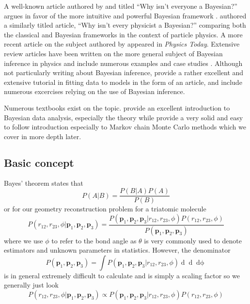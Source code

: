 A well-known article authored by \citet{Efron86} and titled ``Why isn't everyone a Bayesian?'' argues in favor of the more intuitive and powerful Bayesian framework . \citet{Cousins95} authored a similarly titled article, ``Why isn't every physicist a Bayesian?'' comparing both the classical and Bayesian frameworks in the context of particle physics. A more recent article on the subject authored by \citet{Lyons12} appeared in \emph{Physics Today}. Extensive review articles have been written on the more general subject of Bayesian inference in physics and include numerous examples and case studies \citet{vonToussaint11,Dose03,Dagostini03}. Although not particularly writing about Bayesian inference, \citet{Hogg10} provide a rather excellent and extensive tutorial in fitting data to models in the form of an article, and include numerous excercises relying on the use of Bayesian inference.

Numerous textbooks exist on the topic. \citet{Gelman14} provide an excellent introduction to Bayesian data analysis, especially the theory while \citet{Kruschke14} provide a very solid and easy to follow introduction especially to Markov chain Monte Carlo methods which we cover in more depth later.

\subsection{Basic concept}

Bayes' theorem states that
\begin{equation}
  P(A|B) = \frac{P(B|A) P(A)}{P(B)}
\end{equation}
or for our geometry reconstruction problem for a triatomic molecule
\begin{equation}
  P(r_{12}, r_{23}, \phi|\mathbf{p}_1, \mathbf{p}_2, \mathbf{p}_3) = \frac{P(\mathbf{p}_1, \mathbf{p}_2, \mathbf{p}_3|r_{12}, r_{23}, \phi) P(r_{12}, r_{23}, \phi)}{P(\mathbf{p}_1, \mathbf{p}_2, \mathbf{p}_3)}
\end{equation}
where we use $\phi$ to refer to the bond angle as $\theta$ is very commonly used to denote estimators and unknown parameters in statistics. However, the denominator
\begin{equation}
  P(\mathbf{p}_1, \mathbf{p}_2, \mathbf{p}_3) =
    \int P(\mathbf{p}_1, \mathbf{p}_2, \mathbf{p}_3|r_{12}, r_{23}, \phi)
    \mathop{dr_{12}} \mathop{dr_{23}} \mathop{d\phi}
\end{equation}
is in general extremely difficult to calculate and is simply a scaling factor so we generally just look
\begin{equation}
  P(r_{12}, r_{23}, \phi|\mathbf{p}_1, \mathbf{p}_2, \mathbf{p}_3) \propto P(\mathbf{p}_1, \mathbf{p}_2, \mathbf{p}_3|r_{12}, r_{23}, \phi) P(r_{12}, r_{23}, \phi)
\end{equation}

